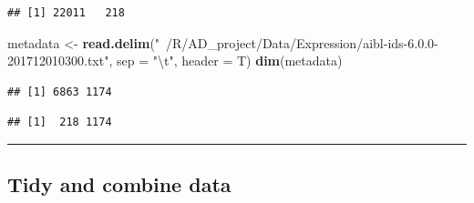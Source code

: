 \documentclass[]{article}
\newenvironment{Shaded}{\begin{snugshade}}{\end{snugshade}}
\newcommand{\KeywordTok}[1]{\textcolor[rgb]{0.13,0.29,0.53}{\textbf{#1}}}
\newcommand{\DataTypeTok}[1]{\textcolor[rgb]{0.13,0.29,0.53}{#1}}
\newcommand{\CharTok}[1]{\textcolor[rgb]{0.31,0.60,0.02}{#1}}
\newcommand{\StringTok}[1]{\textcolor[rgb]{0.31,0.60,0.02}{#1}}
\newcommand{\CommentTok}[1]{\textcolor[rgb]{0.56,0.35,0.01}{\textit{#1}}}
\newcommand{\OperatorTok}[1]{\textcolor[rgb]{0.81,0.36,0.00}{\textbf{#1}}}
\newcommand{\NormalTok}[1]{#1}
\begin{document}
\begin{verbatim}
## [1] 22011   218
\end{verbatim}

\begin{Shaded}
\begin{Highlighting}[]
\NormalTok{metadata <-}\StringTok{ }\KeywordTok{read.delim}\NormalTok{(}\StringTok{"~/R/AD_project/Data/Expression/aibl-ids-6.0.0-201712010300.txt"}\NormalTok{, }\DataTypeTok{sep =} \StringTok{"}\CharTok{\textbackslash{}t}\StringTok{"}\NormalTok{, }\DataTypeTok{header =}\NormalTok{ T)}
\KeywordTok{dim}\NormalTok{(metadata)}
\end{Highlighting}
\end{Shaded}

\begin{verbatim}
## [1] 6863 1174
\end{verbatim}

\begin{Shaded}
\end{Shaded}

\begin{verbatim}
## [1]  218 1174
\end{verbatim}

\begin{center}\rule{0.5\linewidth}{\linethickness}\end{center}

\subsection{Tidy and combine data}\label{tidy-and-combine-data}
\end{document}

